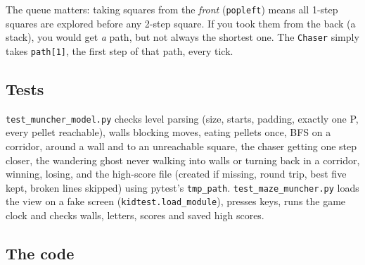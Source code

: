 \documentclass[level=3,teacher]{kidscode}
\begin{document}
\begin{center}
\end{center}

The queue matters: taking squares from the \emph{front} (\texttt{popleft}) means all 1-step squares
are explored before any 2-step square. If you took them from the back (a stack), you would get
\emph{a} path, but not always the shortest one. The \texttt{Chaser} simply takes \texttt{path[1]},
the first step of that path, every tick.

\subsection{Tests}
\texttt{test\_muncher\_model.py} checks level parsing (size, starts, padding, exactly one P, every
pellet reachable), walls blocking moves, eating pellets once, BFS on a corridor, around a wall and
to an unreachable square, the chaser getting one step closer, the wandering ghost never walking
into walls or turning back in a corridor, winning, losing, and the high-score file (created if
missing, round trip, best five kept, broken lines skipped) using pytest's \texttt{tmp\_path}.
\texttt{test\_maze\_muncher.py} loads the view on a fake screen (\texttt{kidtest.load\_module}),
presses keys, runs the game clock and checks walls, letters, scores and saved high scores.

\subsection{The code}
\end{document}
